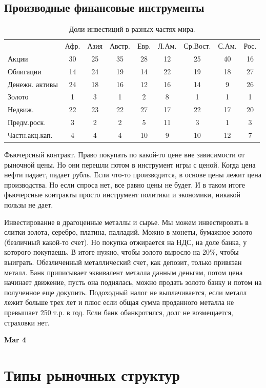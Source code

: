 \documentclass[a4paper, 12pt]{article}
\def\datee#1{\hfill\textbf{#1} \par}
\begin{document}
\subsection{Производные финансовые инструменты}
\begin{table}
\caption{Доли инвестиций в разных частях мира.}
\label{tab:shares}
\begin{tabular}{l c c c c c c c c}
& Афр. & Азия & Австр. & Евр. & Л.Ам. & Ср.Вост. & С.Ам. & Рос. \\
Акции & 30 & 25 & 35 & 28 & 12 & 25 & 40 & 16 \\
Облигации & 14 & 24 & 19 & 14 & 22 & 19 & 18 & 27 \\
Денежн. активы & 24 & 18 & 16 & 12 & 16 & 14 & 9 & 26 \\
Золото & 1 & 3 & 1 & 2 & 8 & 1 & 1 & 1 \\
Недвиж. & 22 & 23 & 22 & 27 & 17 & 22 & 17 & 20 \\
Предм.роск. & 3 & 2 & 2 & 5 & 11 & 3 & 1 & 3 \\
Частн.акц.кап. & 4 & 4 & 4 & 10 & 9 & 10 & 12 & 7 \\
\end{tabular}
\end{table}
Фьючерсный контракт. Право покупать по какой-то цене вне зависимости от рыночной цены. Но они перешли потом в инструмент игры с ценой. Когда цена нефти падает, падает рубль. Если что-то производится, в основе цены лежит цена производства. Но если спроса нет, все равно цены не будет. И в таком итоге фьючерсные контракты просто инструмент политики и экономики, никакой пользы не дает. 

Инвестирование в драгоценные металлы и сырье. Мы можем инвестировать в слитки золота, серебро, платина, палладий. Можно в монеты, бумажное золото (безличный какой-то счет). Но покупка отжирается на НДС, на доле банка, у которого покупаешь. В итоге нужно, чтобы золото выросло на 20\%, чтобы выиграть. Обезличенный металлический счет, как депозит, только привязан металл. Банк приписывает эквивалент металла данным деньгам, потом цена начинает движение, пусть она поднялась, можно продать золото банку и потом на полученное еще докупить. Подоходный налог не выплачивается, если металл лежит больше трех лет и плюс если общая сумма проданного металла не превышает 250 т.р. в год. Если банк обанкротился, долг не возмещается, страховки нет. 

\datee{Mar 4}

\section{Типы рыночных структур}
\end{document}

